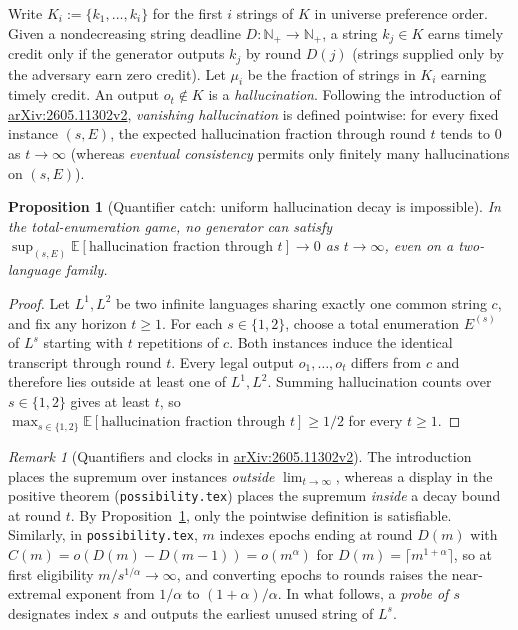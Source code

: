 \documentclass[11pt]{article}
\theoremstyle{plain}
\newtheorem{proposition}[theorem]{Proposition}
\theoremstyle{definition}
\theoremstyle{remark}
\newtheorem{remark}{Remark}
\begin{document}
Write $K_i := \{k_1, \dots, k_i\}$ for the first $i$ strings of $K$ in universe preference order.
Given a nondecreasing string deadline $D : \mathbb{N}_+ \to \mathbb{N}_+$, a string $k_j \in K$ earns timely credit only if the generator outputs $k_j$ by round $D(j)$ (strings supplied only by the adversary earn zero credit).
Let $\mu_i$ be the fraction of strings in $K_i$ earning timely credit.
An output $o_t \notin K$ is a \emph{hallucination}.
Following the introduction of \href{https://arxiv.org/abs/2605.11302}{arXiv:2605.11302v2}, \emph{vanishing hallucination} is defined pointwise: for every fixed instance $(s, E)$, the expected hallucination fraction through round $t$ tends to $0$ as $t \to \infty$ (whereas \emph{eventual consistency} permits only finitely many hallucinations on $(s, E)$).

\begin{proposition}[Quantifier catch: uniform hallucination decay is impossible]\label{prop:quantifier}
In the total-enumeration game, no generator can satisfy $\sup_{(s, E)} \mathbb{E}[\text{hallucination fraction through } t] \to 0$ as $t \to \infty$, even on a two-language family.
\end{proposition}

\begin{proof}
Let $L^1, L^2$ be two infinite languages sharing exactly one common string $c$, and fix any horizon $t \ge 1$.
For each $s \in \{1, 2\}$, choose a total enumeration $E^{(s)}$ of $L^s$ starting with $t$ repetitions of $c$.
Both instances induce the identical transcript through round $t$.
Every legal output $o_1, \dots, o_t$ differs from $c$ and therefore lies outside at least one of $L^1, L^2$.
Summing hallucination counts over $s \in \{1, 2\}$ gives at least $t$, so $\max_{s \in \{1,2\}} \mathbb{E}[\text{hallucination fraction through } t] \ge 1/2$ for every $t \ge 1$.
\end{proof}

\begin{remark}[Quantifiers and clocks in \href{https://arxiv.org/abs/2605.11302}{arXiv:2605.11302v2}]
The introduction places the supremum over instances \emph{outside} $\lim_{t \to \infty}$, whereas a display in the positive theorem (\texttt{possibility.tex}) places the supremum \emph{inside} a decay bound at round $t$.
By Proposition~\ref{prop:quantifier}, only the pointwise definition is satisfiable.
Similarly, in \texttt{possibility.tex}, $m$ indexes epochs ending at round $D(m)$ with $C(m) = o(D(m) - D(m-1)) = o(m^\alpha)$ for $D(m) = \lceil m^{1+\alpha} \rceil$, so at first eligibility $m/s^{1/\alpha} \to \infty$, and converting epochs to rounds raises the near-extremal exponent from $1/\alpha$ to $(1+\alpha)/\alpha$.
In what follows, a \emph{probe of $s$} designates index $s$ and outputs the earliest unused string of $L^s$.
\end{remark}
\end{document}
